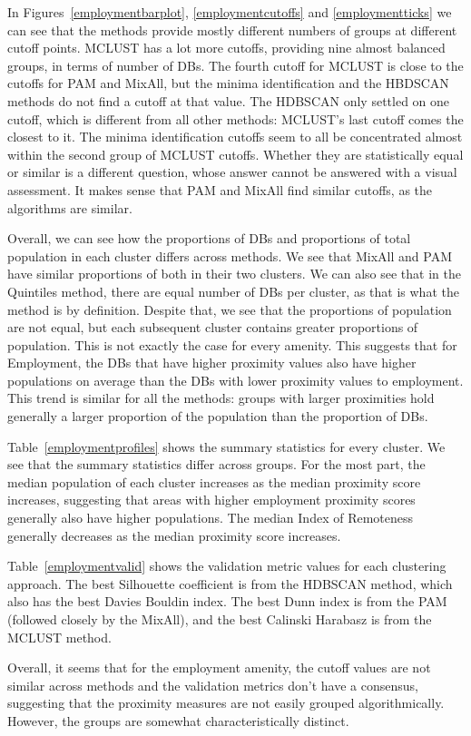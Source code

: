 \documentclass[11pt, a4paper]{article}
\begin{document}
In Figures~\ref{employmentbarplot}, \ref{employmentcutoffs} and \ref{employmentticks} we can see that the methods provide mostly different numbers of groups at different cutoff points. MCLUST has a lot more cutoffs, providing nine almost balanced groups, in terms of number of DBs. The fourth cutoff for MCLUST is close to the cutoffs for PAM and MixAll, but the minima identification and the HBDSCAN methods do not find a cutoff at that value. The HDBSCAN only settled on one cutoff, which is different from all other methods: MCLUST's last cutoff comes the closest to it. The minima identification cutoffs seem to all be concentrated almost within the second group of MCLUST cutoffs. Whether they are statistically equal or similar is a different question, whose answer cannot be answered with a visual assessment. It makes sense that PAM and MixAll find similar cutoffs, as the algorithms are similar.
\par
Overall, we can see how the proportions of DBs and proportions of total population in each cluster differs across methods.  We see that MixAll and PAM have similar proportions of both in their two clusters. We can also see that in the Quintiles method, there are equal number of DBs per cluster, as that is what the method is by definition.  Despite that,  we see that the proportions of population are not equal, but each subsequent cluster contains greater proportions of population. This is not exactly the case for every amenity. This suggests that for Employment, the DBs that have higher proximity values also have higher populations on average than the DBs with lower proximity values to employment.  This trend is similar for all the methods: groups with larger proximities hold generally a larger proportion of the population than the proportion of DBs.
\par
Table~\ref{employmentprofiles} shows the summary statistics for every cluster. We see that the summary statistics differ across groups. For the most part, the median population of each cluster increases as the median proximity score increases, suggesting that areas with higher employment proximity scores generally also have higher populations. The median Index of Remoteness generally decreases as the median proximity score increases.
\par
Table~\ref{employmentvalid} shows the validation metric values for each clustering approach. The best Silhouette coefficient is from the HDBSCAN method, which also has the best Davies Bouldin index. The best Dunn index is from the PAM (followed closely by the MixAll), and the best Calinski Harabasz is from the MCLUST method.
\par
Overall, it seems that for the employment amenity, the cutoff values are not similar across methods and the validation metrics don't have a consensus, suggesting that the proximity measures are not easily grouped algorithmically. However, the groups are somewhat characteristically distinct.
\end{document}
